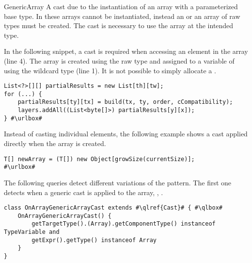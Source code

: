 \begin{pattern}{GenericArray}
A cast due to the instantiation of an array with a parameterized base type.
In \java{} these arrays cannot be instantiated,
instead an  or an array of raw types must be created.
The cast is necessary to use the array at the intended type. 

\instances{}
In the following snippet,
a cast is required when accessing an element in the array (line 4).
The array is created using the raw type 
and assigned to a variable of using the wildcard type  (line 1).
It is not possible to simply allocate a .

\def\urlvar{http://bit.ly/ppiastucki_recast4j_2EM7zWK}
\begin{verbatim}
List<?>[][] partialResults = new List[th][tw];
for (...) {
    partialResults[ty][tx] = build(tx, ty, order, cCompatibility);
    layers.addAll((List<byte[]>) partialResults[y][x]);
} #\urlbox#
\end{verbatim}

Instead of casting individual elements,
the following example shows a cast applied directly when the array is created. 

\def\urlvar{http://bit.ly/seven332_Nimingban_2UdBwIL}
\begin{verbatim}
T[] newArray = (T[]) new Object[growSize(currentSize)];
#\urlbox#
\end{verbatim}


\detection{}
The following queries detect different variations of the \thisp{} pattern.
The first one detects when a generic cast is applied to the array,
\eg{}, .

\begin{listing}
\begin{verbatim}
class OnArrayGenericArrayCast extends #\qlref{Cast}# { #\qlbox#
	OnArrayGenericArrayCast() {
		getTargetType().(Array).getComponentType() instanceof TypeVariable and
		getExpr().getType() instanceof Array
	}
}
\end{verbatim}
\end{listing}


\end{pattern}
